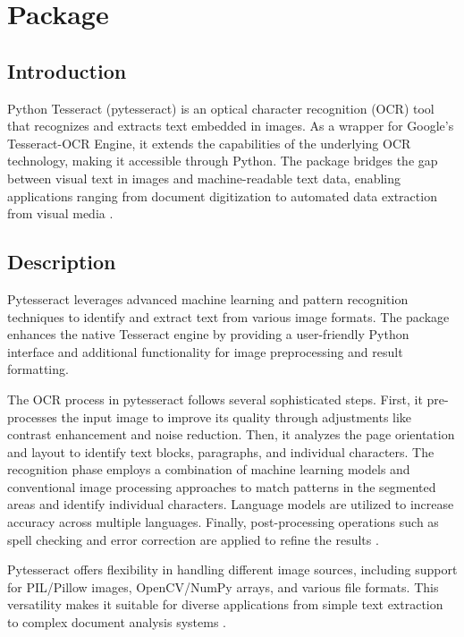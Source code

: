 	\section{Package}

\subsection{Introduction}
Python Tesseract (pytesseract) is an optical character recognition (OCR) tool that recognizes and extracts text embedded in images. As a wrapper for Google's Tesseract-OCR Engine, it extends the capabilities of the underlying OCR technology, making it accessible through Python. The package bridges the gap between visual text in images and machine-readable text data, enabling applications ranging from document digitization to automated data extraction from visual media \cite {DataCamp:2024, Betterpath:2023}.

\subsection{Description}
Pytesseract leverages advanced machine learning and pattern recognition techniques to identify and extract text from various image formats. The package enhances the native Tesseract engine by providing a user-friendly Python interface and additional functionality for image preprocessing and result formatting.

The OCR process in pytesseract follows several sophisticated steps. First, it pre-processes the input image to improve its quality through adjustments like contrast enhancement and noise reduction. Then, it analyzes the page orientation and layout to identify text blocks, paragraphs, and individual characters. The recognition phase employs a combination of machine learning models and conventional image processing approaches to match patterns in the segmented areas and identify individual characters. Language models are utilized to increase accuracy across multiple languages. Finally, post-processing operations such as spell checking and error correction are applied to refine the results \cite {DataCamp:2024, GeekyAnts:2023}.

Pytesseract offers flexibility in handling different image sources, including support for PIL/Pillow images, OpenCV/NumPy arrays, and various file formats. This versatility makes it suitable for diverse applications from simple text extraction to complex document analysis systems \cite {Betterpath:2023, DataCamp:2024}.

